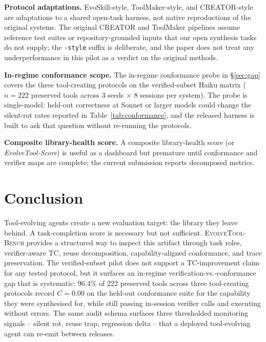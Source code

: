 \documentclass[sigconf,anonymous,review,natbib=false]{acmart}
\begin{document}
\textbf{Protocol adaptations.} EvoSkill-style, ToolMaker-style, and CREATOR-style are adaptations to a shared open-task harness, not native reproductions of the original systems. The original CREATOR and ToolMaker pipelines assume reference test suites or repository-grounded inputs that our open synthesis tasks do not supply; the \texttt{-style} suffix is deliberate, and the paper does not treat any underperformance in this pilot as a verdict on the original methods.

\textbf{In-regime conformance scope.} The in-regime conformance probe in \S\ref{sec:gap} covers the three tool-creating protocols on the verified-subset Haiku matrix ($n{=}222$ preserved tools across 3 seeds $\times$ 8 sessions per system). The probe is single-model: held-out correctness at Sonnet or larger models could change the silent-rot rates reported in Table~\ref{tab:conformance}, and the released harness is built to ask that question without re-running the protocols.

\textbf{Composite library-health score.} A composite library-health score (or \emph{EvolveTool-Score}) is useful as a dashboard but premature until conformance and verifier maps are complete; the current submission reports decomposed metrics.

\section{Conclusion}

Tool-evolving agents create a new evaluation target: the library they leave behind. A task-completion score is necessary but not sufficient. \textsc{EvolveTool-Bench} provides a structured way to inspect this artifact through task roles, verifier-aware TC, reuse decomposition, capability-aligned conformance, and trace preservation. The verified-subset pilot does not support a TC-improvement claim for any tested protocol, but it surfaces an in-regime verification-vs.-conformance gap that is systematic: $96.4\%$ of 222 preserved tools across three tool-creating protocols record $C{=}0.00$ on the held-out conformance suite for the capability they were synthesised for, while still passing in-session verifier calls and executing without errors. The same audit schema surfaces three thresholded monitoring signals -- silent rot, reuse trap, regression delta -- that a deployed tool-evolving agent can re-emit between releases.
\end{document}
